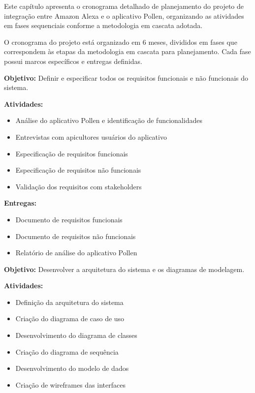 \label{cap:cronograma}

Este capítulo apresenta o cronograma detalhado de planejamento do projeto de integração entre Amazon Alexa e o aplicativo Pollen, organizando as atividades em fases sequenciais conforme a metodologia em cascata adotada.

\label{sec:atividades-marcos-projeto}

O cronograma do projeto está organizado em 6 meses, divididos em fases que correspondem às etapas da metodologia em cascata para planejamento. Cada fase possui marcos específicos e entregas definidas.


\textbf{Objetivo:} Definir e especificar todos os requisitos funcionais e não funcionais do sistema.

\textbf{Atividades:}
\begin{itemize}
    \item Análise do aplicativo Pollen e identificação de funcionalidades
    \item Entrevistas com apicultores usuários do aplicativo
    \item Especificação de requisitos funcionais
    \item Especificação de requisitos não funcionais
    \item Validação dos requisitos com stakeholders
\end{itemize}

\textbf{Entregas:}
\begin{itemize}
    \item Documento de requisitos funcionais
    \item Documento de requisitos não funcionais
    \item Relatório de análise do aplicativo Pollen
\end{itemize}


\textbf{Objetivo:} Desenvolver a arquitetura do sistema e os diagramas de modelagem.

\textbf{Atividades:}
\begin{itemize}
    \item Definição da arquitetura do sistema
    \item Criação do diagrama de caso de uso
    \item Desenvolvimento do diagrama de classes
    \item Criação do diagrama de sequência
    \item Desenvolvimento do modelo de dados
    \item Criação de wireframes das interfaces
\end{itemize}

